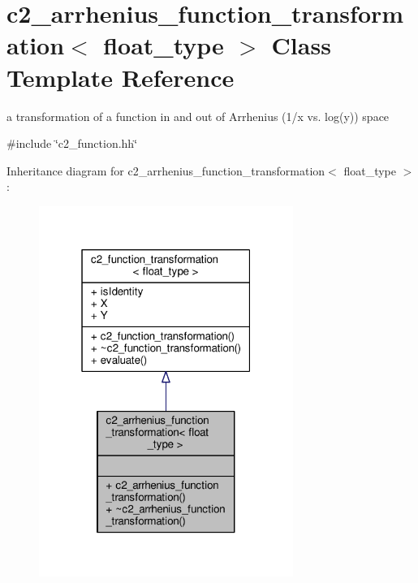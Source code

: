 \hypertarget{classc2__arrhenius__function__transformation}{}\section{c2\+\_\+arrhenius\+\_\+function\+\_\+transformation$<$ float\+\_\+type $>$ Class Template Reference}
\label{classc2__arrhenius__function__transformation}


a transformation of a function in and out of Arrhenius (1/x vs. log(y)) space  




{\ttfamily \#include \char`\"{}c2\+\_\+function.\+hh\char`\"{}}



Inheritance diagram for c2\+\_\+arrhenius\+\_\+function\+\_\+transformation$<$ float\+\_\+type $>$\+:
\nopagebreak
\begin{figure}[H]
\begin{center}
\leavevmode
\includegraphics[width=235pt]{classc2__arrhenius__function__transformation__inherit__graph}
\end{center}
\end{figure}


